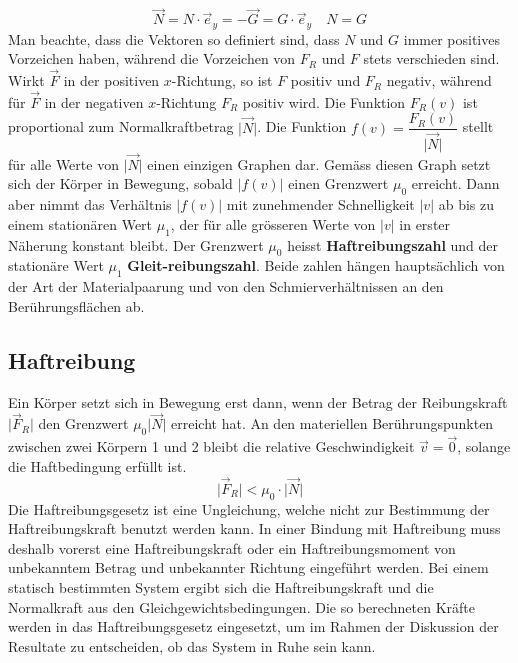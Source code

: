 \begin{equation}
\boxed{\overrightarrow{N}=N\cdot \overrightarrow{e}_y=-\overrightarrow{G}=G\cdot \overrightarrow{e}_y}\quad \boxed{N=G} 
\end{equation}
Man beachte, dass die Vektoren so definiert sind, dass $N$ und $G$ immer positives Vorzeichen haben, während die Vorzeichen von $F_R$ und $F$ stets verschieden sind. Wirkt $\overrightarrow{F}$ in der positiven $x$-Richtung, so ist $F$ positiv und $F_R$ negativ, während für $\overrightarrow{F}$ in der negativen $x$-Richtung $F_R$ positiv wird. 
\newline\newline
Die Funktion $F_R\left(v\right)$ ist proportional zum Normalkraftbetrag $\Big\vert \overrightarrow{N}\Big\vert$. Die Funktion $f\left(v\right)=\dfrac{F_R\left(v\right)}{\Big\vert \overrightarrow{N}\Big\vert}$ stellt  für alle Werte von $\Big\vert \overrightarrow{N}\Big\vert$ einen einzigen Graphen dar. Gemäss diesen Graph setzt sich der Körper in Bewegung, sobald $\Big\vert f\left(v\right)\Big\vert$ einen Grenzwert $\mu_0$ erreicht. Dann aber nimmt das Verhältnis $\Big\vert f\left(v\right)\Big\vert$ mit zunehmender Schnelligkeit $\Big\vert v\Big\vert$ ab bis zu einem stationären Wert $\mu_1$, der für alle grösseren Werte von $\Big\vert v\Big\vert$ in erster Näherung konstant bleibt.
\newline\newline
Der Grenzwert $\mu_0$ heisst \textbf{Haftreibungszahl} und der stationäre Wert $\mu_1$ \textbf{Gleit-reibungszahl}. Beide zahlen hängen hauptsächlich von der Art der Materialpaarung und von den Schmierverhältnissen an den Berührungsflächen ab. 
\subsection{Haftreibung}
Ein Körper setzt sich in Bewegung erst dann, wenn der Betrag der Reibungskraft $\Big\vert \overrightarrow{F}_R\Big\vert$ den Grenzwert $\mu_0\Big\vert \overrightarrow{N}\Big\vert$ erreicht hat.
\newline\newline
An den materiellen Berührungspunkten zwischen zwei Körpern 1 und 2 bleibt die relative Geschwindigkeit $\overrightarrow{v}=\overrightarrow{0}$, solange die Haftbedingung erfüllt ist.
\begin{equation}
\boxed{\Big\vert \overrightarrow{F}_R\Big\vert<\mu_0\cdot \Big\vert \overrightarrow{N}\Big\vert}
\end{equation}
Die Haftreibungsgesetz ist eine Ungleichung, welche nicht zur Bestimmung der Haftreibungskraft benutzt werden kann. In einer Bindung mit Haftreibung muss deshalb vorerst eine Haftreibungskraft oder ein Haftreibungsmoment von unbekanntem Betrag und unbekannter Richtung eingeführt werden. Bei einem statisch bestimmten System ergibt sich die Haftreibungskraft und die Normalkraft aus den Gleichgewichtsbedingungen. Die so berechneten Kräfte werden in das Haftreibungsgesetz eingesetzt, um im Rahmen der Diskussion der Resultate zu entscheiden, ob das System in Ruhe sein kann.
